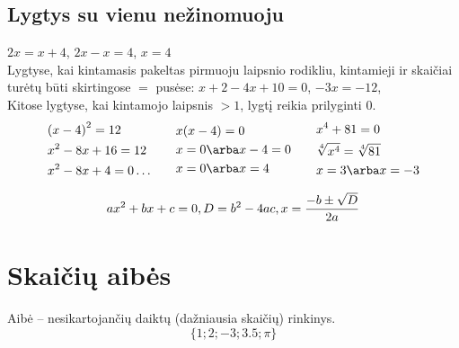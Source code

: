 
\subsection{Lygtys su vienu nežinomuoju}
$2x = x + 4$, $2x - x = 4$, $x = 4$ \\
Lygtyse, kai kintamasis pakeltas pirmuoju laipsnio rodikliu, kintamieji ir skaičiai turėtų būti skirtingose $=$ pusėse:
$x + 2 - 4x + 10 = 0$, $-3x = -12$, \\
Kitose lygtyse, kai kintamojo laipsnis $ > 1$, lygtį reikia prilyginti $0$.
\begin{equation}    
\begin{aligned}
    & {(x - 4)}^2 = 12 \\
    & x^2 - 8x + 16 = 12 \\
    & x^2 - 8x + 4 = 0 \dots
\end{aligned}
\qquad
\begin{aligned}
    & x(x - 4) = 0 \\
    & x = 0\arba x - 4 = 0 \\
    & x = 0\arba x = 4    
\end{aligned}
\qquad
\begin{aligned}    
    & x^4 + 81 = 0 \\
    & \sqrt[4]{x^4} = \sqrt[4]{81} \\
    & x = 3 \arba  x = -3
\end{aligned}
\end{equation}

\begin{equation}
    ax^2 + bx + c = 0, \\
    D = b^2 - 4ac,     \\
    x = \frac{-b \pm \sqrt{D}}{2a}
\end{equation}


\section{Skaičių aibės}
Aibė -- nesikartojančių daiktų (dažniausia skaičių) rinkinys.
\begin{equation}
\{1; 2; -3; 3.5; \pi\}
\end{equation}

